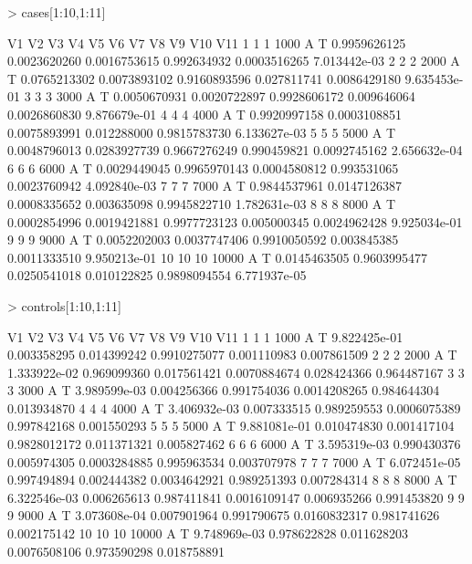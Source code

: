 \documentclass[11pt]{article}
\begin{document}
\normalsize
\begin{Schunk}
\begin{Sinput}
> cases[1:10,1:11]
\end{Sinput}
\end{Schunk}
\scriptsize
\begin{Schunk}
\begin{Soutput}
   V1 V2    V3 V4 V5           V6           V7           V8          V9          V10          V11
1   1  1  1000  A  T 0.9959626125 0.0023620260 0.0016753615 0.992634932 0.0003516265 7.013442e-03
2   2  2  2000  A  T 0.0765213302 0.0073893102 0.9160893596 0.027811741 0.0086429180 9.635453e-01
3   3  3  3000  A  T 0.0050670931 0.0020722897 0.9928606172 0.009646064 0.0026860830 9.876679e-01
4   4  4  4000  A  T 0.9920997158 0.0003108851 0.0075893991 0.012288000 0.9815783730 6.133627e-03
5   5  5  5000  A  T 0.0048796013 0.0283927739 0.9667276249 0.990459821 0.0092745162 2.656632e-04
6   6  6  6000  A  T 0.0029449045 0.9965970143 0.0004580812 0.993531065 0.0023760942 4.092840e-03
7   7  7  7000  A  T 0.9844537961 0.0147126387 0.0008335652 0.003635098 0.9945822710 1.782631e-03
8   8  8  8000  A  T 0.0002854996 0.0019421881 0.9977723123 0.005000345 0.0024962428 9.925034e-01
9   9  9  9000  A  T 0.0052202003 0.0037747406 0.9910050592 0.003845385 0.0011333510 9.950213e-01
10 10 10 10000  A  T 0.0145463505 0.9603995477 0.0250541018 0.010122825 0.9898094554 6.771937e-05
\end{Soutput}
\end{Schunk}

\normalsize
\begin{Schunk}
\begin{Sinput}
> controls[1:10,1:11]
\end{Sinput}
\end{Schunk}
\scriptsize
\begin{Schunk}
\begin{Soutput}
   V1 V2    V3 V4 V5           V6          V7          V8           V9         V10         V11
1   1  1  1000  A  T 9.822425e-01 0.003358295 0.014399242 0.9910275077 0.001110983 0.007861509
2   2  2  2000  A  T 1.333922e-02 0.969099360 0.017561421 0.0070884674 0.028424366 0.964487167
3   3  3  3000  A  T 3.989599e-03 0.004256366 0.991754036 0.0014208265 0.984644304 0.013934870
4   4  4  4000  A  T 3.406932e-03 0.007333515 0.989259553 0.0006075389 0.997842168 0.001550293
5   5  5  5000  A  T 9.881081e-01 0.010474830 0.001417104 0.9828012172 0.011371321 0.005827462
6   6  6  6000  A  T 3.595319e-03 0.990430376 0.005974305 0.0003284885 0.995963534 0.003707978
7   7  7  7000  A  T 6.072451e-05 0.997494894 0.002444382 0.0034642921 0.989251393 0.007284314
8   8  8  8000  A  T 6.322546e-03 0.006265613 0.987411841 0.0016109147 0.006935266 0.991453820
9   9  9  9000  A  T 3.073608e-04 0.007901964 0.991790675 0.0160832317 0.981741626 0.002175142
10 10 10 10000  A  T 9.748969e-03 0.978622828 0.011628203 0.0076508106 0.973590298 0.018758891
\end{Soutput}
\end{Schunk}
\end{document}
